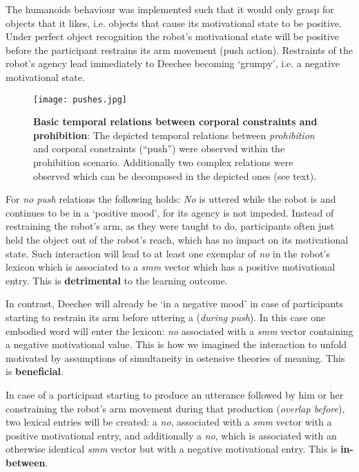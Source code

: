 The humanoids behaviour was implemented such that it would only grasp for objects that it likes, i.e. objects that cause its motivational state to be 
positive. Under perfect object recognition the robot's motivational state will be positive before the participant restrains its arm movement (push action).
Restraints of the robot's agency lead immediately to Deechee becoming `grumpy', i.e. a negative motivational state.
\begin{figure*}[h]
  \hspace*{-2ex}
  \texttt{[image: pushes.jpg]}
  \caption{\textbf{Basic temporal relations between corporal constraints and prohibition}: The depicted temporal relations between
    \emph{prohibition} and corporal constraints (``push'') were observed within the prohibition scenario. Additionally
    two complex relations were observed which can be decomposed in the depicted ones (see text).}
  \label{fig:push_rels}
\end{figure*}
For \emph{no push} relations the following holds: \emph{No} is uttered while the robot is and continues to be in a `positive mood', for its agency 
is not impeded. Instead of restraining the robot's arm, as they were taught to do, participants often just held the object out of the robot's reach, 
which has no impact on its motivational state. Such interaction will lead to at least one exemplar of \emph{no} in the robot's lexicon which is 
associated to a \emph{smm} vector which has a positive motivational entry. This is \textbf{detrimental} to the learning outcome.

In contrast, Deechee will already be `in a negative mood' in case of participants starting to restrain its arm before uttering a 
(\emph{during push}). In this case one embodied word will enter the lexicon: \emph{no} associated with a \emph{smm} vector containing a negative 
motivational value. This is how we imagined the interaction to unfold motivated by assumptions of simultaneity in ostensive theories of meaning. 
This is \textbf{beneficial}.

In case of a participant starting to produce an utterance followed by him or her constraining the robot's arm movement during that production (\emph{overlap before}), 
two lexical entries will be created: a \emph{no}, associated with a \emph{smm} vector with a positive motivational entry, and additionally a \emph{no}, which is 
associated with an otherwise identical \emph{smm} vector but with a negative motivational entry. This is \textbf{in-between}.

